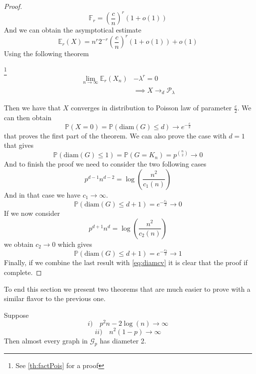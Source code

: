 \begin{proof}
	
	\begin{equation}
		\mathbb{F}_r = (\frac{c}{n})^r(1+o(1))
	\end{equation}
	And we can obtain the asymptotical estimate
	\begin{equation}
		\mathbb{E}_r(X) = n^r2^{-r}(\frac{c}{n})^r(1+o(1)) + o(1)
	\end{equation}
	Using the following theorem 
	\begin{theorem}\footnote{See \ref{th:factPois} for a proof}
		\begin{align}
			\lim_{n\to\infty} \mathbb{E}_r(X_n) &- \lambda^r = 0 \\
					&\implies X \longrightarrow_d \mathcal{P}_{\lambda}
		\end{align}
	\end{theorem}
	Then we have that $X$ converges in distribution to Poisson law of parameter $\frac{c}{2}$.
	\newline
	We can then obtain 
	\begin{equation}\label{eq:diamcv}
		\mathbb{P}(X=0) = \mathbb{P}(\text{diam}(G) \leq d) \longrightarrow e^{-\frac{c}{2}}
	\end{equation}
	that proves the first part of the theorem. We can also prove the case with $d=1$ that gives
	\begin{equation}
		\mathbb{P}(\text{diam}(G) \leq 1) = \mathbb{P}(G = K_n) = p^{\binom{n}{2}} \longrightarrow 0
	\end{equation}
	And to finish the proof we need to consider the two following cases
	\begin{equation}
		p^{d-1}n^{d-2} = \log(\frac{n^2}{c_1(n)})
	\end{equation}
	And in that case we have $c_1 \longrightarrow \infty$.
	\begin{equation}
		\mathbb{P}(\text{diam}(G) \leq d+1) = e^{-\frac{c_1}{2}} \longrightarrow 0
	\end{equation}
	If we now consider
	\begin{equation}
		p^{d+1}n^d = \log(\frac{n^2}{c_2(n)})
	\end{equation}
	we obtain $c_2 \longrightarrow 0$ which gives
	\begin{equation}
		\mathbb{P}(\text{diam}(G) \leq d+1) = e^{-\frac{c_2}{2}} \longrightarrow 1
	\end{equation}
	Finally, if we combine the last result with \ref{eq:diamcv} it is clear that the proof if complete.
\end{proof}
	To end this section we present two theorems that are much easier to prove with a similar flavor to the previous one.
	\begin{theorem}\label{th:diam2}
	Suppose 
	\begin{equation}
		i) \quad p^2n - 2\log(n) \longrightarrow \infty
	\end{equation}
	\begin{equation}
		ii) \quad n^2(1-p) \longrightarrow \infty
	\end{equation}
	Then almost every graph in $\mathcal{G}_p$ has diameter 2.
\end{theorem}

